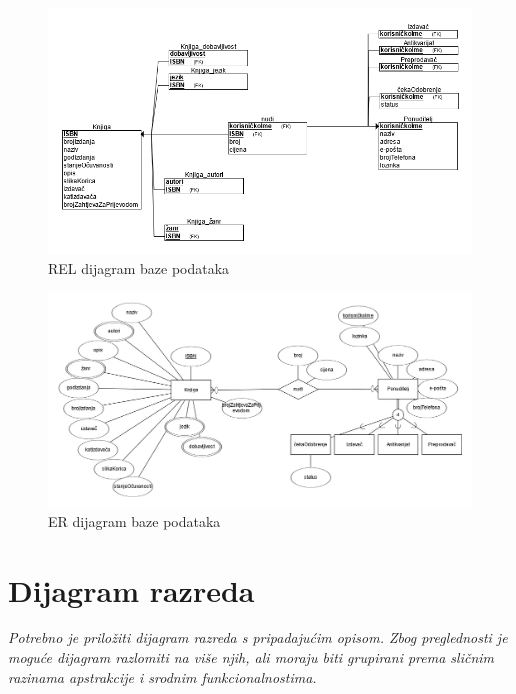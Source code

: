 				\begin{figure}[H]
					\includegraphics[width=\textwidth]{dijagrami/baza_relmod_v2.PNG} %
					\centering
					\caption{REL dijagram baze podataka}
					\label{fig:arh1}
				\end{figure}
				
				\eject
				
				\begin{figure}[H]
					\includegraphics[width=\textwidth]{dijagrami/baza_ERmod_v2.PNG} %
					\centering
					\caption{ER dijagram baze podataka}
					\label{fig:arh2}
				\end{figure}
				
			
			\eject
			
			
		\section{Dijagram razreda}
		
			\textit{Potrebno je priložiti dijagram razreda s pripadajućim opisom. Zbog preglednosti je moguće dijagram razlomiti na više njih, ali moraju biti grupirani prema sličnim razinama apstrakcije i srodnim funkcionalnostima.}\\
			
